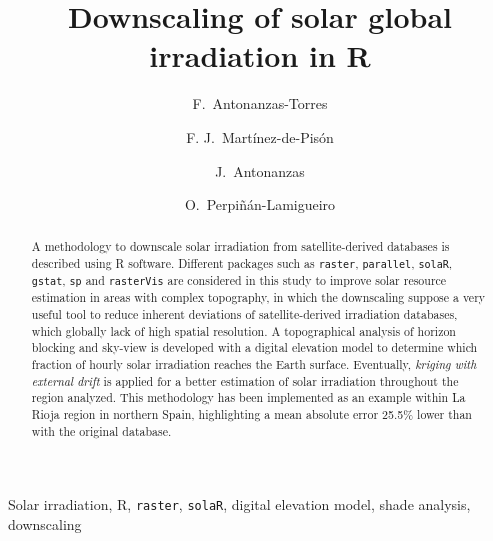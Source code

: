\documentclass[authoryear, sort&compress]{elsarticle}
\begin{document}
\begin{frontmatter}

  \title{Downscaling of solar global irradiation in R}

  \author[edmans]{F.~Antonanzas-Torres}
   


  \author[edmans]{F. J.~Martínez-de-Pisón}


  \author[edmans]{J.~Antonanzas}


 \author[euiti,ies]{O.~Perpiñán-Lamigueiro}

  \address[edmans]{EDMANS Group, Department of Mechanical Engineering, University of La Rioja, Logroño, Spain.}

 \address[euiti]{Electrical Engineering Department, EUITI-UPM, Ronda
   de Valencia 3, 28012 Madrid, Spain.}

 \address[ies]{Instituto de Energía Solar, Ciudad Universitaria s/n,
  Madrid, Spain}


  \begin{abstract}

 A methodology to downscale solar irradiation from
    satellite-derived databases is described using R
    software. Different packages such as \texttt{raster},
    \texttt{parallel}, \texttt{solaR}, \texttt{gstat}, \texttt{sp}
    and \texttt{rasterVis} are considered in this study to improve
    solar resource estimation in areas with complex topography, in
    which the downscaling suppose a very useful tool to reduce
    inherent deviations of satellite-derived irradiation
    databases, which globally lack of high spatial resolution. A
    topographical analysis of horizon blocking and sky-view is
    developed with a digital elevation model to determine which
    fraction of hourly solar irradiation reaches the Earth
    surface. Eventually, \emph{kriging with external drift} is
    applied for a better estimation of solar irradiation
    throughout the region analyzed. This methodology has been
    implemented as an example within La Rioja region in northern
    Spain, highlighting a mean absolute error 25.5\% lower than
    with the original database. 
  
  \end{abstract}

\begin{keyword}
  Solar  irradiation, R, \texttt{raster}, \texttt{solaR}, digital elevation model, shade analysis, downscaling
\end{keyword}

\end{frontmatter}
\end{document}
